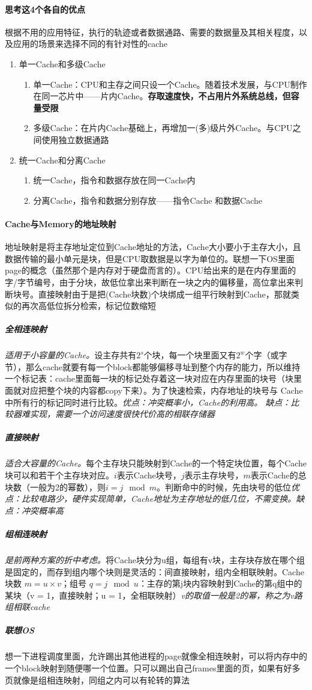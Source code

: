 \documentclass[]{report}
\begin{document}
		\paragraph{思考这4个各自的优点} 根据不用的应用特征，执行的轨迹或者数据通路、需要的数据量及其相关程度，以及应用的场景来选择不同的有针对性的cache
		\begin{enumerate}
			\item 单一Cache和多级Cache
			\begin{enumerate}
				\item 单一Cache：CPU和主存之间只设一个Cache。随着技术发展，与CPU制作在同一芯片中——片内Cache。\textbf{存取速度快，不占用片外系统总线，但容量受限}
				\item 多级Cache：在片内Cache基础上，再增加一(多)级片外Cache。与CPU之间使用独立数据通路
			\end{enumerate}
			\item 统一Cache和分离Cache
			\begin{enumerate}
				\item 统一Cache，指令和数据存放在同一Cache内
				\item 分离Cache，指令和数据分别存放——指令Cache 和数据Cache
			\end{enumerate}
		\end{enumerate}
		\paragraph{Cache与Memory的地址映射} 地址映射是将主存地址定位到Cache地址的方法，Cache大小要小于主存大小，且数据传输的最小单元是块，但是CPU取数据是以字为单位的。联想一下OS里面page的概念（虽然那个是内存对于硬盘而言的）。CPU给出来的是在内存里面的字/字节编号，由于分块，故低位拿出来判断在一块之内的偏移量，高位拿出来判断块号。直接映射由于是把(Cache块数)个块绑成一组平行映射到Cache，那就类似的再次高低位拆分检索，标记位数缩短
			\subparagraph{全相连映射} \textit{适用于小容量的Cache。}设主存共有$2^s$个块，每一个块里面又有$2^w$个字（或字节），那么cache就要有每一个block都能够偏移寻址到整个内存的能力，所以维持一个标记表：cache里面每一块的标记处存着这一块对应在内存里面的块号（块里面就对应把整个块的内容都copy下来）。为了快速检索，内存地址的块号与 Cache中所有行的标记同时进行比较。\textit{优点：冲突概率小，Cache的利用高。 缺点：比较器难实现，需要一个访问速度很快代价高的相联存储器}
			\subparagraph{直接映射} \textit{适合大容量的Cache。}每个主存块只能映射到Cache的一个特定块位置，每个Cache块可以和若干个主存块对应。$i$表示Cache块号，$j$表示主存块号，$m$表示Cache的总块数（一般为2的幂数），则$i = j \mod{m}$。判断命中的时候，先由块号的低位\textit{优点：比较电路少，硬件实现简单，Cache地址为主存地址的低几位，不需变换。缺点：冲突概率高}
			\subparagraph{组相连映射} \textit{是前两种方案的折中考虑。}将Cache块分为u组，每组有v块，主存块存放在哪个组是固定的，而存到组内哪个块则是灵活的：间直接映射，组内全相联映射。Cache块数 $m = u\times v$；组号 $q = j \mod{u}$：主存的第j块内容映射到Cache的第q组中的某块（v = 1，直接映射；u = 1，全相联映射）\textit{v的取值一般是2的幂，称之为v路组相联cache}
			\subparagraph{联想OS} 想一下进程调度里面，允许踢出其他进程的page就像全相连映射，可以将内存中的一个block映射到随便哪一个位置。只可以踢出自己frames里面的页，如果有好多页就像是组相连映射，同组之内可以有轮转的算法
\end{document}

